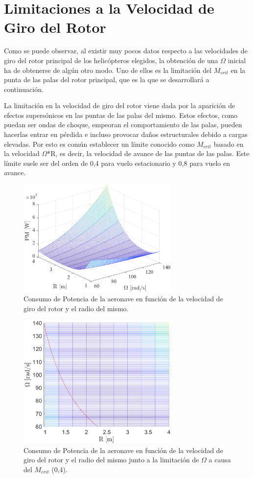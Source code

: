 \section{Limitaciones a la Velocidad de Giro del Rotor}

Como se puede observar, al existir muy pocos datos respecto a las velocidades de giro del rotor principal de los helicópteros elegidos, la obtención de una $\Omega$ inicial ha de obtenerse de algún otro modo. Uno de ellos es la limitación del $M_{crit}$ en la punta de las palas del rotor principal, que es la que se desarrollará a continuación.

La limitación en la velocidad de giro del rotor viene dada por la aparición de efectos supersónicos en las puntas de las palas del mismo. Estos efectos, como puedan ser ondas de choque, empeoran el comportamiento de las palas, pueden hacerlas entrar en pérdida e incluso provocar daños estructurales debido a cargas elevadas.
Por esto es común establecer un límite conocido como $M_{crit}$ basado en la velocidad $\Omega$*R, es decir, la velocidad de avance de las puntas de las palas. Este límite suele ser del orden de 0,4 para vuelo estacionario y 0,8 para vuelo en avance. 


\begin{figure}
	\centering
	\includegraphics[width=80mm]{graficos/3d3d}
	\caption{Consumo de Potencia de la aeronave en función de la velocidad de giro del rotor y el radio del mismo.}
	\label{ORP}
\end{figure}
\begin{figure}
	\centering
	\includegraphics[width=80mm]{graficos/3d2d2}
	\caption{Consumo de Potencia de la aeronave en función de la velocidad de giro del rotor y el radio del mismo junto a la limitación de $\Omega$ a causa del $M_{crit}$ (0,4).}
	\label{ORPM}
\end{figure}

